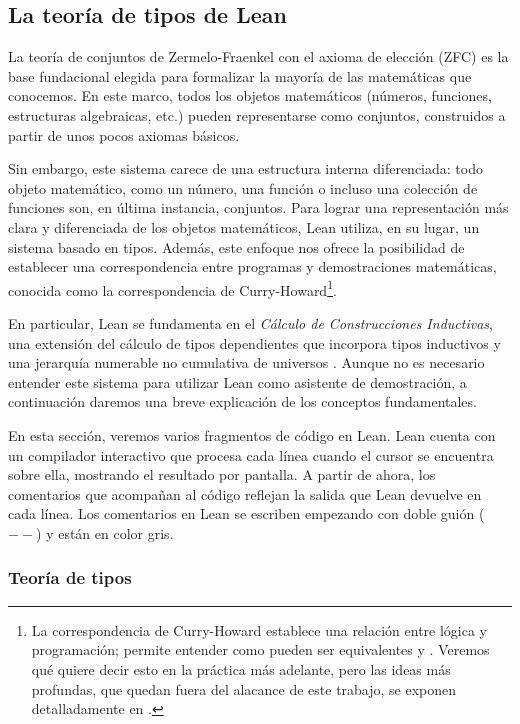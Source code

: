 \subsection{La teoría de tipos de Lean}

La teoría de conjuntos de Zermelo-Fraenkel con el axioma de elección (ZFC) es la base fundacional elegida para formalizar la mayoría de las matemáticas que conocemos. En este marco, todos los objetos matemáticos (números, funciones, estructuras algebraicas, etc.) pueden representarse como conjuntos, construidos a partir de unos pocos axiomas básicos.

Sin embargo, este sistema carece de una estructura interna diferenciada: todo objeto matemático, como un número, una función o incluso una colección de funciones son, en última instancia, conjuntos. Para lograr una representación más clara y diferenciada de los objetos matemáticos, Lean utiliza, en su lugar, un sistema basado en tipos. Además, este enfoque nos ofrece la posibilidad de establecer una correspondencia entre programas y demostraciones matemáticas, conocida como la correspondencia de Curry-Howard\footnote{La correspondencia de Curry-Howard establece una relación entre lógica y programación; permite entender como pueden ser equivalentes  y . Veremos qué quiere decir esto en la práctica más adelante, pero las ideas más profundas, que quedan fuera del alacance de este trabajo, se exponen detalladamente en \cite{sorensen2006lectures}.}.

En particular, Lean se fundamenta en el \textit{Cálculo de Construcciones Inductivas}, una extensión del cálculo de tipos dependientes que incorpora tipos inductivos y una jerarquía numerable no cumulativa de universos \cite{coquand1986calculus}. Aunque no es necesario entender este sistema para utilizar Lean como asistente de demostración, a continuación daremos una breve explicación de los conceptos fundamentales.

En esta sección, veremos varios fragmentos de código en Lean. Lean cuenta con un compilador interactivo que procesa cada línea cuando el cursor se encuentra sobre ella, mostrando el resultado por pantalla. A partir de ahora, los comentarios que acompañan al código reflejan la salida que Lean devuelve en cada línea. Los comentarios en Lean se escriben empezando con doble guión ($--$) y están en color gris.

\subsubsection{Teoría de tipos}

